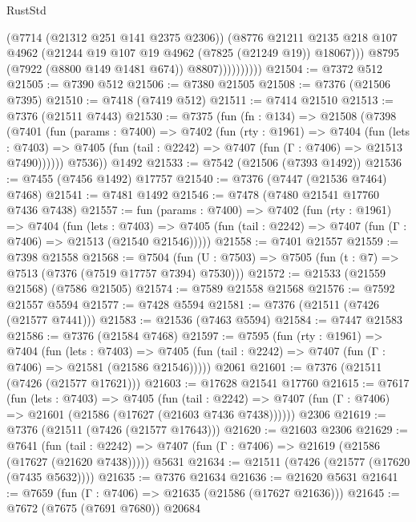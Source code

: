 \begin{lexlean}{RustStd}
\begin{coremodule}
                          (@7714 (@21312 @251 @141 @2375 @2306))
                          (@8776
                            @21211
                            @2135
                            @218
                            @107
                            @4962
                            (@21244 @19 @107 @19 @4962 (@7825 (@21249 @19)) @18067)))
                        @8795
                        (@7922 (@8800 @149 @1481 @674))
                        @8807))))))))))
@21504 := @7372 @512
@21505 := @7390 @512
@21506 := @7380 @21505
@21508 := @7376 (@21506 @7395)
@21510 := @7418 (@7419 @512)
@21511 := @7414 @21510
@21513 := @7376 (@21511 @7443)
@21530 := @7375
    (fun (fn : @134) =>
    @21508
      (@7398
        (@7401
          (fun (params : @7400) =>
          @7402
            (fun (rty : @1961) =>
            @7404
              (fun (lets : @7403) =>
              @7405 (fun (tail : @2242) => @7407 (fun (Γ : @7406) => @21513 @7490))))))
        @7536))
    @1492
@21533 := @7542 (@21506 (@7393 @1492))
@21536 := @7455 (@7456 @1492) @17757
@21540 := @7376 (@7447 (@21536 @7464) @7468)
@21541 := @7481 @1492
@21546 := @7478 (@7480 @21541 @17760 @7436 @7438)
@21557 := fun (params : @7400) =>
  @7402
    (fun (rty : @1961) =>
    @7404
      (fun (lets : @7403) =>
      @7405 (fun (tail : @2242) => @7407 (fun (Γ : @7406) => @21513 (@21540 @21546)))))
@21558 := @7401 @21557
@21559 := @7398 @21558
@21568 := @7504
    (fun (U : @7503) => @7505 (fun (t : @7) => @7513 (@7376 (@7519 @17757 @7394) @7530)))
@21572 := @21533 (@21559 @21568) (@7586 @21505)
@21574 := @7589 @21558 @21568
@21576 := @7592 @21557 @5594
@21577 := @7428 @5594
@21581 := @7376 (@21511 (@7426 (@21577 @7441)))
@21583 := @21536 (@7463 @5594)
@21584 := @7447 @21583
@21586 := @7376 (@21584 @7468)
@21597 := @7595
    (fun (rty : @1961) =>
    @7404
      (fun (lets : @7403) =>
      @7405 (fun (tail : @2242) => @7407 (fun (Γ : @7406) => @21581 (@21586 @21546)))))
    @2061
@21601 := @7376 (@21511 (@7426 (@21577 @17621)))
@21603 := @17628 @21541 @17760
@21615 := @7617
    (fun (lets : @7403) =>
    @7405
      (fun (tail : @2242) =>
      @7407 (fun (Γ : @7406) => @21601 (@21586 (@17627 (@21603 @7436 @7438))))))
    @2306
@21619 := @7376 (@21511 (@7426 (@21577 @17643)))
@21620 := @21603 @2306
@21629 := @7641
    (fun (tail : @2242) => @7407 (fun (Γ : @7406) => @21619 (@21586 (@17627 (@21620 @7438)))))
    @5631
@21634 := @21511 (@7426 (@21577 (@17620 (@7435 @5632))))
@21635 := @7376 @21634
@21636 := @21620 @5631
@21641 := @7659 (fun (Γ : @7406) => @21635 (@21586 (@17627 @21636)))
@21645 := @7672 (@7675 (@7691 @7680)) @20684

\end{coremodule}
\end{lexlean}

